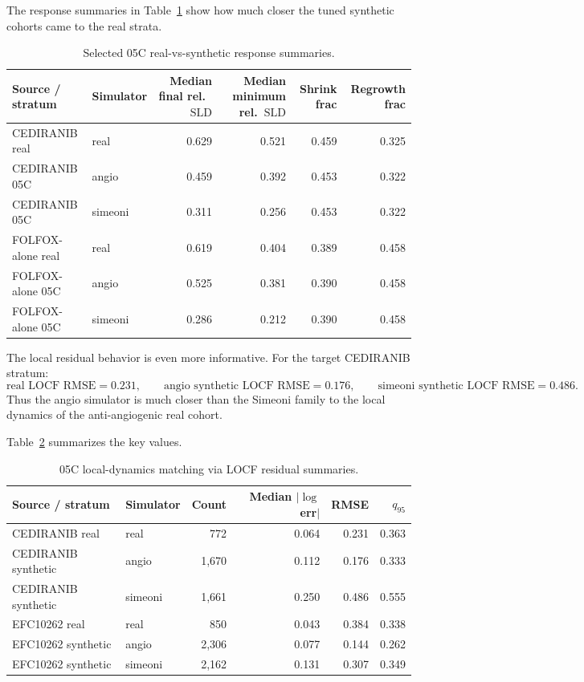 \documentclass[11pt,a4paper]{article}
\newcommand{\sld}{\ensuremath{\mathrm{SLD}}}
\begin{document}
The response summaries in Table~\ref{tab:05c-response} show how much closer the tuned synthetic cohorts came to the real strata.

\begin{table}[H]
\centering
\small
\caption{Selected 05C real-vs-synthetic response summaries.}
\label{tab:05c-response}
\begin{tabular}{p{}p{}rrrr}
\toprule
Source / stratum & Simulator & Median final rel.\ \sld{} & Median minimum rel.\ \sld{} & Shrink frac & Regrowth frac \\
\midrule
CEDIRANIB real & real & 0.629 & 0.521 & 0.459 & 0.325 \\
CEDIRANIB 05C & angio & 0.459 & 0.392 & 0.453 & 0.322 \\
CEDIRANIB 05C & simeoni & 0.311 & 0.256 & 0.453 & 0.322 \\
FOLFOX-alone real & real & 0.619 & 0.404 & 0.389 & 0.458 \\
FOLFOX-alone 05C & angio & 0.525 & 0.381 & 0.390 & 0.458 \\
FOLFOX-alone 05C & simeoni & 0.286 & 0.212 & 0.390 & 0.458 \\
\bottomrule
\end{tabular}
\end{table}

The local residual behavior is even more informative. For the target CEDIRANIB stratum:
\[
\text{real LOCF RMSE}=0.231,
\qquad
\text{angio synthetic LOCF RMSE}=0.176,
\qquad
\text{simeoni synthetic LOCF RMSE}=0.486.
\]
Thus the angio simulator is much closer than the Simeoni family to the local dynamics of the anti-angiogenic real cohort.

Table~\ref{tab:05c-residual} summarizes the key values.

\begin{table}[H]
\centering
\small
\caption{05C local-dynamics matching via LOCF residual summaries.}
\label{tab:05c-residual}
\begin{tabular}{p{}p{}rrrr}
\toprule
Source / stratum & Simulator & Count & Median $|\log$ err$|$ & RMSE & $q_{95}$ \\
\midrule
CEDIRANIB real & real & 772 & 0.064 & 0.231 & 0.363 \\
CEDIRANIB synthetic & angio & 1,670 & 0.112 & 0.176 & 0.333 \\
CEDIRANIB synthetic & simeoni & 1,661 & 0.250 & 0.486 & 0.555 \\
EFC10262 real & real & 850 & 0.043 & 0.384 & 0.338 \\
EFC10262 synthetic & angio & 2,306 & 0.077 & 0.144 & 0.262 \\
EFC10262 synthetic & simeoni & 2,162 & 0.131 & 0.307 & 0.349 \\
\bottomrule
\end{tabular}
\end{table}
\end{document}
